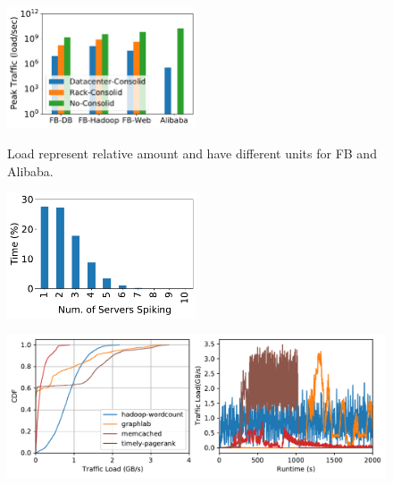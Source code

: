 {
\begin{figure}[t]
\begin{center}
\centerline{\includegraphics[width=0.5\textwidth]{snic/Figures/fig_fb_alibaba_trace.pdf}}
{
Load represent relative amount and have different units for FB and Alibaba.
}
\end{center}
\end{figure}
}
{
\begin{figure}[t]
\begin{center}
\centerline{\includegraphics[width=0.5\textwidth]{snic/Figures/spike-trace-analysis.pdf}}
{
}
\end{center}
\end{figure}
}
{
\begin{figure}[t]
\begin{center}
\centerline{\includegraphics[width=\textwidth]{snic/Figures/fig-osdi16-net-trace.pdf}}
{
}
\end{center}
\end{figure}
}
